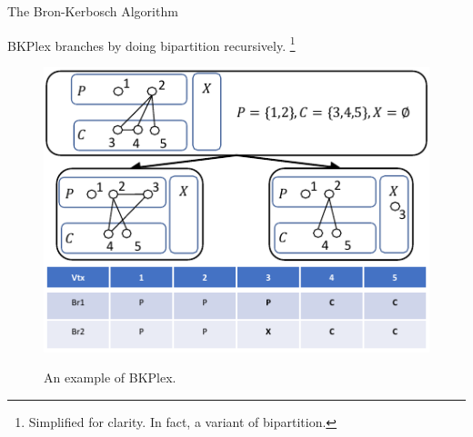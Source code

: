 \documentclass[9pt,notheorems]{beamer} %
\begin{document}
\begin{frame}{The Bron-Kerbosch Algorithm}
    \begin{center}
        BKPlex branches by doing bipartition recursively. \footnote{Simplified for clarity. In fact, a variant of bipartition.}
    \end{center}
    \begin{figure}
    \includegraphics[width=0.65\linewidth]{pic/bkrec.pdf}\\
    \caption{An example of BKPlex.}
\end{figure}
\end{frame}
\end{document}
